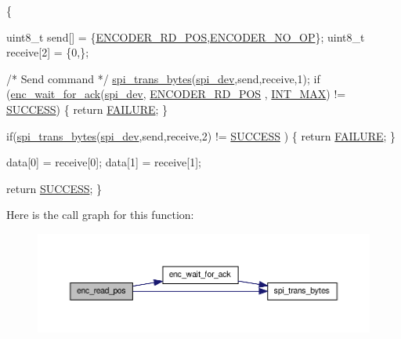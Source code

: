 \begin{DoxyCode}
                                                      \{

    uint8\_t send[] = \{\hyperlink{encoder__functions_8h_a24e6c0e05e904b10f56ae184da9e2aca}{ENCODER\_RD\_POS},\hyperlink{encoder__functions_8h_ac10b0f18ed2164776ad6843aa7908592}{ENCODER\_NO\_OP}\};
    uint8\_t receive[2] = \{0,\};
    
    \textcolor{comment}{/* Send command */}
    \hyperlink{group__spi_ga3ae450d2b3ece27bb6036f811a7625a9}{spi\_trans\_bytes}(\hyperlink{CommunicationV0_2communication_8c_a4788f0a5355494bc6c13690e28f43783}{spi\_dev},send,receive,1);
    \textcolor{keywordflow}{if} (\hyperlink{group__enc_gad82fb44f2e735628ec95e003e4a1f93c}{enc\_wait\_for\_ack}(\hyperlink{CommunicationV0_2communication_8c_a4788f0a5355494bc6c13690e28f43783}{spi\_dev}, \hyperlink{encoder__functions_8h_a24e6c0e05e904b10f56ae184da9e2aca}{ENCODER\_RD\_POS}
      , \hyperlink{encoder__functions_8h_a9ec306f36d50c7375e74f0d1c55a3a67}{INT\_MAX}) != \hyperlink{calibration_2calibration_8h_aa90cac659d18e8ef6294c7ae337f6b58}{SUCCESS}) \{ 
        \textcolor{keywordflow}{return} \hyperlink{calibration_2calibration_8h_a6d58f9ac447476b4e084d7ca383f5183}{FAILURE}; 
    \}

    \textcolor{keywordflow}{if}(\hyperlink{group__spi_ga3ae450d2b3ece27bb6036f811a7625a9}{spi\_trans\_bytes}(\hyperlink{CommunicationV0_2communication_8c_a4788f0a5355494bc6c13690e28f43783}{spi\_dev},send,receive,2) != \hyperlink{calibration_2calibration_8h_aa90cac659d18e8ef6294c7ae337f6b58}{SUCCESS}
      ) \{ 
        \textcolor{keywordflow}{return} \hyperlink{calibration_2calibration_8h_a6d58f9ac447476b4e084d7ca383f5183}{FAILURE}; 
    \}

   data[0] = receive[0];
   data[1] = receive[1];

   \textcolor{keywordflow}{return} \hyperlink{calibration_2calibration_8h_aa90cac659d18e8ef6294c7ae337f6b58}{SUCCESS};
\}
\end{DoxyCode}


Here is the call graph for this function\-:
\nopagebreak
\begin{figure}[H]
\begin{center}
\leavevmode
\includegraphics[width=350pt]{group__enc_ga813c09cc4d9af8b357fe440a9438e685_cgraph}
\end{center}
\end{figure}


